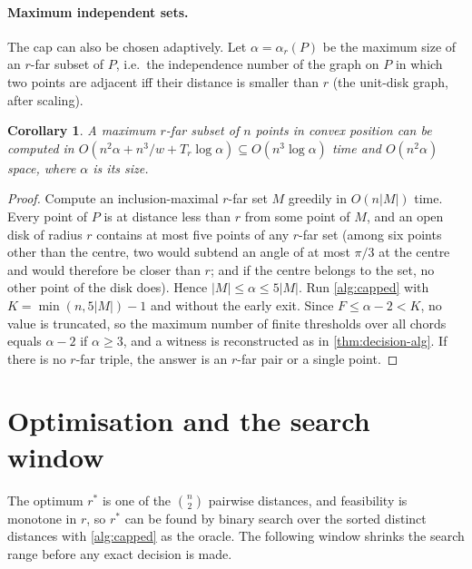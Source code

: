 \documentclass[11pt,a4paper]{article}
\newtheorem{corollary}[theorem]{Corollary}
\theoremstyle{definition}
\theoremstyle{remark}
\newcommand{\rstar}{r^{*}}
\newcommand{\Tr}{T_r}
\begin{document}
\paragraph{Maximum independent sets.}
The cap can also be chosen adaptively. Let $\alpha=\alpha_r(P)$ be the maximum
size of an $r$-far subset of $P$, i.e.\ the independence number of the graph on
$P$ in which two points are adjacent iff their distance is smaller than $r$
(the unit-disk graph, after scaling).

\begin{corollary}\label{cor:mis}
A maximum $r$-far subset of $n$ points in convex position can be computed in
$O(n^2\alpha+n^3/w+\Tr\log\alpha)\subseteq O(n^3\log\alpha)$ time and
$O(n^2\alpha)$ space, where $\alpha$ is its size.
\end{corollary}
\begin{proof}
Compute an inclusion-maximal $r$-far set $M$ greedily in $O(n|M|)$ time. Every
point of $P$ is at distance less than $r$ from some point of $M$, and an open
disk of radius $r$ contains at most five points of any $r$-far set (among six
points other than the centre, two would subtend an angle of at most $\pi/3$ at
the centre and would therefore be closer than $r$; and if the centre belongs
to the set, no other point of the disk does).
Hence $|M|\le\alpha\le5|M|$. Run \cref{alg:capped} with
$K=\min(n,5|M|)-1$ and without the early exit. Since $F\le\alpha-2<K$, no
value is truncated, so the maximum number of finite thresholds over all chords
equals $\alpha-2$ if $\alpha\ge3$, and a witness is reconstructed as in
\cref{thm:decision-alg}. If there is no $r$-far triple, the answer is an
$r$-far pair or a single point.
\end{proof}

\section{Optimisation and the search window}\label{sec:opt}

The optimum $\rstar$ is one of the $\binom n2$ pairwise distances, and
feasibility is monotone in $r$, so $\rstar$ can be found by binary search over
the sorted distinct distances with \cref{alg:capped} as the oracle. The
following window shrinks the search range before any exact decision is made.
\end{document}
